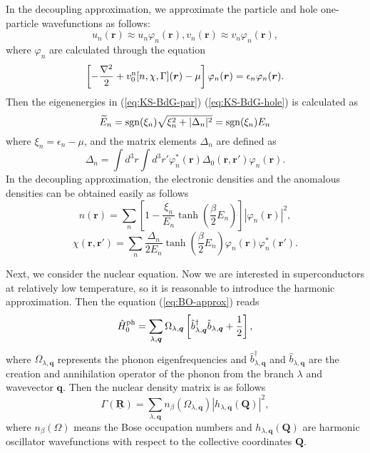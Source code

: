 In the decoupling approximation, we approximate the particle and hole one-particle wavefunctions as follows:
%
\begin{equation}
	u_n(\bm{r}) \approx u_n\varphi_n(\bm{r}),   v_n(\bm{r}) \approx v_n\varphi_n(\bm{r}), 
	\label{eq:approx-wfc}
\end{equation}
%
where $\varphi_n$ are calculated through the equation
\begin{equation}
	\left[ -\frac{\nabla^2}{2} + v^{\rm n}_0[n, \chi, \Gamma](\bm{r}) - \mu \right]
	\varphi_n(\bm{r}) = \epsilon_n\varphi_n(\bm{r}).
	\label{eq:KS-eq}
\end{equation}
%
Then the eigenenergies in (\ref{eq:KS-BdG-par}) (\ref{eq:KS-BdG-hole}) is calculated as
%
\begin{equation}
	\widetilde{E}_n = {\rm sgn}(\xi_n)\sqrt{\xi^2_n + |\Delta_n|^2}
	                = {\rm sgn}(\xi_n) E_n
			\label{eq:KS-energy}
\end{equation}
%
where $\xi_n = \epsilon_n - \mu$, and the matrix elements $\Delta_n$ are defined as
%
\begin{equation}
	\Delta_n = \int d^3r\int d^3r' \varphi^{\ast}_n(\bm{r})\Delta_0(\bm{r}, \bm{r'})\varphi_n(\bm{r}).
	\label{eq:Deltan}
\end{equation}
%
In the decoupling approximation, the electronic densities and the anomalous densities 
can be obtained easily as follows
%
\begin{equation}
	n(\bm{r}) = \sum_{n} \left[1-\frac{\xi_n}{E_n}\tanh \left(\frac{\beta}{2}E_n \right) \right]
	                     |\varphi_n(\bm{r})|^2,
	\label{eq:el-density}
\end{equation}
%
\begin{equation}
	\chi(\bm{r}, \bm{r'}) = \sum_{n}\frac{\Delta_n}{2E_n}\tanh \left(\frac{\beta}{2}E_n \right)
	\varphi_n(\bm{r})\varphi^{\ast}_n(\bm{r'}).
	\label{eq:anom-density}
\end{equation}
%

Next, we consider the nuclear equation. Now we are interested in superconductors at relatively low temperature, 
so it is reasonable to introduce the harmonic approximation. Then the equation (\ref{eq:BO-approx}) reads
%
\begin{equation}
	\hat{H}^{\rm ph}_{\rm 0} = \sum_{\lambda, \bm{q}}\Omega_{\lambda, \bm{q}}
	\left[\hat{b}^{\dag}_{\lambda, \bm{q}}\hat{b}_{\lambda, \bm{q}} + \frac{1}{2} \right],
	\label{eq:harm}
\end{equation}
%
where $\Omega_{\lambda, \bm{q}}$ represents the phonon eigenfrequencies and 
$\hat{b}^{\dag}_{\lambda, \bm{q}}$ and $\hat{b}_{\lambda, \bm{q}}$ are the creation and annihilation
operator of the phonon from the branch $\lambda$ and wavevector $\bm{q}$.
Then the nuclear density matrix is as follows
%
\begin{equation}
	\Gamma(\underline{\bm{R}}) = \sum_{\lambda, \bm{q}}n_\beta(\Omega_{\lambda, \bm{q}})
	|h_{\lambda, \bm{q}}(\bm{Q})|^2,
\end{equation}
%
where $n_\beta(\Omega)$ means the Bose occupation numbers and $h_{\lambda, \bm{q}}(\bm{Q})$ are
harmonic oscillator wavefunctions with respect to the collective coordinates $\bm{Q}$.

